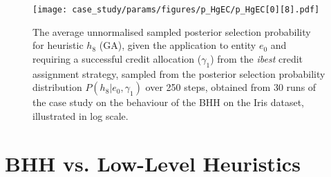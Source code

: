 \begin{figure}[htpb]
	\centering
	\texttt{[image: case\_study/params/figures/p\_HgEC/p\_HgEC[0][8].pdf]}
	\caption{The average unnormalised sampled posterior selection probability for heuristic $h_{8}$ (\acs{GA}), given the application to entity $e_{0}$ and requiring a successful credit allocation ($\gamma_{1}$) from the \textit{ibest} credit assignment strategy, sampled from the posterior selection probability distribution $P(h_{8} \vert e_{0}, \gamma_{1})$ over 250 steps, obtained from 30 runs of the case study on the behaviour of the \acs{BHH} on the Iris dataset, illustrated in log scale.}
	\label{fig:results:case_study:p_HgEC:0:8}
\end{figure}

\section{BHH vs. Low-Level Heuristics}\label{sec:results:bhh_vs_low_level_heuristics}


